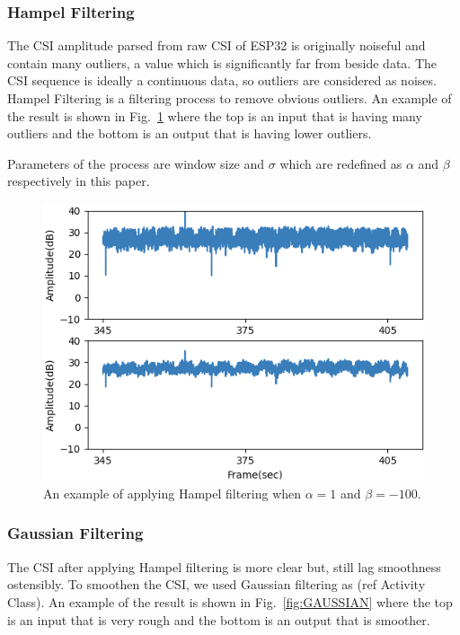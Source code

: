 \documentclass[10pt,letterpaper]{article}
\begin{document}
	\subsubsection*{Hampel Filtering}
	
	The CSI amplitude parsed from raw CSI of ESP32 is originally noiseful and contain many outliers, a value which is significantly far from beside data. The CSI sequence is ideally a continuous data, so outliers are considered as noises.  Hampel Filtering is a filtering process to remove obvious outliers. An example of the result is shown in  Fig.~\ref{fig:HAMPEL} where the top is an input that is having many outliers and the bottom is an output that is having lower outliers.
	
		Parameters of the process are window size and $\sigma$ which are redefined as $\alpha$ and $\beta$ respectively in this paper.
		
		\begin{figure}[htbp]
		\centerline{\includegraphics[width=120mm,scale=0.9]{FILPD_R2H.png}}
		\caption{An example of applying Hampel filtering when $\alpha=1$ and $\beta=-100$.}
		\label{fig:HAMPEL}
	\end{figure}

	\subsubsection*{Gaussian Filtering}
	
	 The CSI after applying Hampel filtering is more clear but, still lag smoothness ostensibly. To smoothen the CSI, we used Gaussian filtering as (ref Activity Class).
	An example of the result is shown in  Fig.~\ref{fig:GAUSSIAN} where the top is an input that is very rough and the bottom is an output that is smoother.
	
\end{document}
